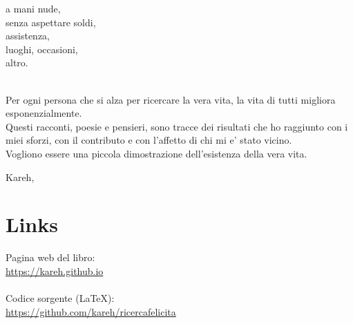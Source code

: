 \begin{poem}
a mani nude,\\
senza aspettare soldi,\\
assistenza,\\
luoghi, occasioni,\\
altro.\\
\end{poem}

\leavevmode\\
Per ogni persona che si alza per ricercare la vera vita,
la vita di tutti migliora esponenzialmente.\\

Questi racconti, poesie e pensieri, sono tracce dei risultati che ho raggiunto con i miei sforzi, con il contributo e con l'affetto di chi mi e' stato vicino.\\
Vogliono essere una piccola dimostrazione dell'esistenza della vera vita.

\begin{flushright}
    \vspace*{\fill}
    Kareh, \finishDate
\end{flushright}


\section{Links}

Pagina web del libro:\\
\url{https://kareh.github.io}\\

\leavevmode\\
Codice sorgente (LaTeX):\\
\url{https://github.com/kareh/ricercafelicita}

